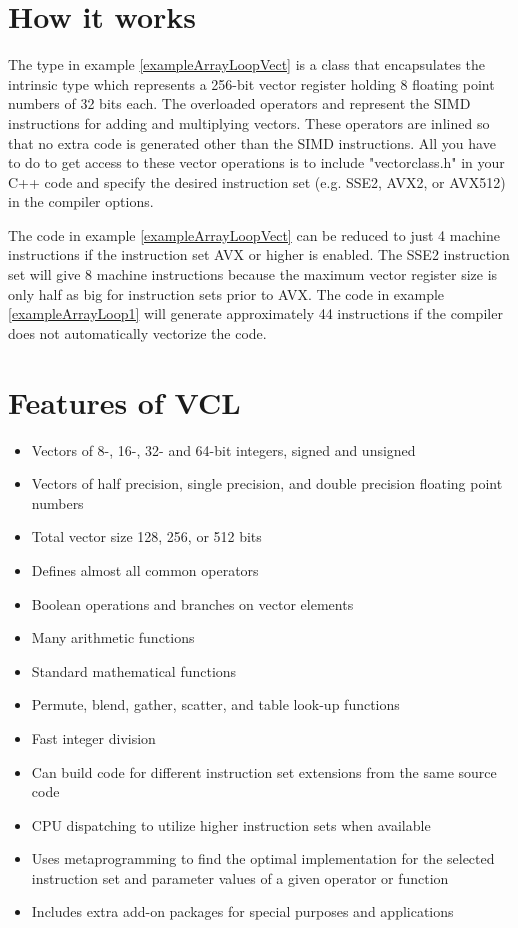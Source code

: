 \documentclass[vcl_manual.tex]{subfiles}
\begin{document}
\section{How it works} \label{HowItWorks}
The type  in example \ref{exampleArrayLoopVect} is a class that encapsulates the intrinsic type 
 which represents a 256-bit vector register holding 8 floating point numbers of 32 bits each. The overloaded operators \codei{+} and \codei{*} represent the SIMD instructions for adding and multiplying vectors. These operators are inlined so that no extra code is generated other than the SIMD instructions. All you have to do to get access to these vector operations is to include "vectorclass.h" in your C++ code and specify the desired instruction set (e.g. SSE2, AVX2, or AVX512) in the compiler options.

The code in example \ref{exampleArrayLoopVect} can be reduced to just 4 machine instructions if the instruction set AVX or higher is enabled. The SSE2 instruction set will give 8 machine instructions because the maximum vector register size is only half as big for instruction sets prior to AVX. The code in example \ref{exampleArrayLoop1} will generate approximately 44 instructions if the compiler does not automatically vectorize the code.

\section{Features of VCL} \label{Features}

\begin{itemize}
\item Vectors of 8-, 16-, 32- and 64-bit integers, signed and unsigned
\item Vectors of half precision, single precision, and double precision floating point numbers
\item Total vector size 128, 256, or 512 bits
\item Defines almost all common operators
\item Boolean operations and branches on vector elements
\item Many arithmetic functions
\item Standard mathematical functions
\item Permute, blend, gather, scatter, and table look-up functions
\item Fast integer division
\item Can build code for different instruction set extensions from the same source code
\item CPU dispatching to utilize higher instruction sets when available
\item Uses metaprogramming to find the optimal implementation for the selected instruction set and parameter values of a given operator or function
\item Includes extra add-on packages for special purposes and applications
\end{itemize}
\end{document}
